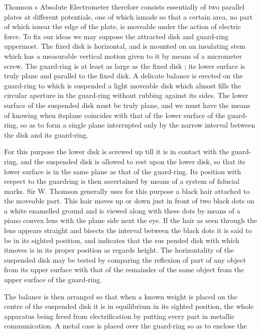 \documentclass[11pt,a4paper]{article}
\begin{document}
Thomson s Absolute Electrometer therefore consists essentially of two parallel plates at different potentials, one of which ismade so that a certain area, no part of which isnear the edge of the plate, is moveable under the action of electric force. To fix our ideas we may suppose the attracted disk and guard-ring uppermost. The fixed disk is horizontal, and is mounted on an insulating stem which has a measurable vertical motion given to it by means of a micrometer screw. The guard-ring is at least as large as the fixed disk ; its lower surface is truly plane and parallel to the fixed disk. A delicate balance is erected on the guard-ring to which is suspended a light moveable disk which almost fills the circular aperture in the guard-ring without rubbing against its sides. The lower surface of the suspended disk must be truly plane, and we must have the means of knowing when itsplane coincides with that of the lower surface of the guard-ring, so as to form a single plane interrupted only by the narrow interval between the disk and its guard-ring.

For this purpose the lower disk is screwed up till it is in contact with the guard-ring, and the suspended disk is allowed to rest upon the lower disk, so that its lower surface is in the same plane as that of the guard-ring. Its position with respect to the guardring is then ascertained by means of a system of fiducial marks. Sir W. Thomson generally uses for this purpose a black hair attached to the moveable part. This hair moves up or down just in front of two black dots on a white enamelled ground and is viewed along with these dots by means of a piano convex lens with the plane side next the eye. If the hair as seen through the lens appears straight and bisects the interval between the black dots it is said to be in its sighted position, and indicates that the sus pended disk with which itmoves is in its proper position as regards height. The horizontality of the suspended disk may be tested by comparing the reflexion of part of any object from its upper surface with that of the remainder of the same object from the upper surface of the guard-ring.

The balance is then arranged so that when a known weight is placed on the centre of the suspended disk it is in equilibrium in its sighted position, the whole apparatus being freed from electrification by putting every part in metallic communication. A metal case is placed over the guard-ring so as to enclose the
\end{document}
